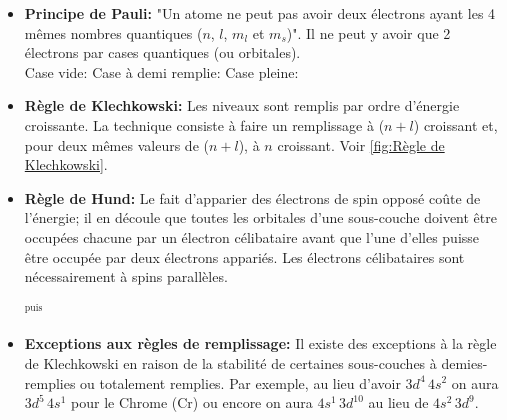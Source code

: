 \documentclass{article}
\begin{document}
\begin{itemize}[label=$\ast$]
    \item \textbf{Principe de Pauli:} "Un atome ne peut pas avoir deux électrons ayant
    les 4 mêmes nombres quantiques ($n$, $l$, $m_l$ et $m_s$)".
    Il ne peut y avoir que 2 électrons par cases quantiques (ou orbitales).\\
    Case vide: \electron{}{\emp} \quad Case à demi remplie: \electron{}{\haut} \quad Case pleine: \electron{}{\updwn}

    \item \textbf{Règle de Klechkowski:} Les niveaux sont remplis par ordre d'énergie
    croissante. La technique consiste à faire un remplissage à ($n + l$) croissant et,
    pour deux mêmes valeurs de ($n + l$), à $n$ croissant. Voir \ref{fig:Règle de Klechkowski}.
    \item \textbf{Règle de Hund:} Le fait d'apparier des électrons de spin opposé
    coûte de l'énergie; il en découle que toutes les orbitales d'une sous-couche
    doivent être occupées chacune par un électron célibataire avant que l'une d'elles
    puisse être occupée par deux électrons appariés. Les électrons célibataires sont nécessairement à spins parallèles. 
    \begin{center}
              \hspace{3mm} {\Large $^{\text{puis}}$} \hspace{3mm}
    \end{center}
    \item \textbf{Exceptions aux règles de remplissage:} Il existe des exceptions à la
    règle de Klechkowski en raison de la stabilité de certaines sous-couches à
    demies-remplies ou totalement remplies. Par exemple, au lieu d'avoir
    $3d^4\,4s^2$ on aura $3d^5\,4s^1$ pour le Chrome (Cr) ou encore on aura $4s^1\,3d^{10}$ au lieu de $4s^2\,3d^9$.
\end{itemize}
\end{document}
